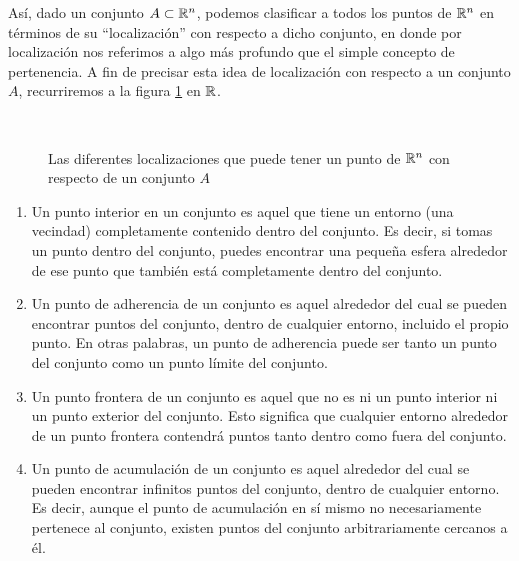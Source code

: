 Así, dado un conjunto $A \subset \RR[n]$, podemos clasificar a todos los puntos de $\RR[n]$ en términos de su “localización” con respecto a dicho conjunto, en donde por localización nos referimos a algo más profundo que el simple concepto de pertenencia. A fin de precisar esta idea de localización con respecto a un conjunto $A$, recurriremos a la figura \ref{fig:clasificacion_de_puntos} en $\RR$.
\begin{figure}[h!]
    \centering
     \hfill
     \\
     \hfill
    \caption{Las diferentes localizaciones que puede tener un punto de $\RR[n]$ con respecto de un conjunto $A$}
    \label{fig:clasificacion_de_puntos}
\end{figure}
\begin{enumerate}[label=\alph*)]
    \item Un punto interior en un conjunto es aquel que tiene un entorno (una vecindad) completamente contenido dentro del conjunto. Es decir, si tomas un punto dentro del conjunto, puedes encontrar una pequeña esfera alrededor de ese punto que también está completamente dentro del conjunto.
    \item Un punto de adherencia de un conjunto es aquel alrededor del cual se pueden encontrar puntos del conjunto, dentro de cualquier entorno, incluido el propio punto. En otras palabras, un punto de adherencia puede ser tanto un punto del conjunto como un punto límite del conjunto.
    \item Un punto frontera de un conjunto es aquel que no es ni un punto interior ni un punto exterior del conjunto. Esto significa que cualquier entorno alrededor de un punto frontera contendrá puntos tanto dentro como fuera del conjunto.
    \item Un punto de acumulación de un conjunto es aquel alrededor del cual se pueden encontrar infinitos puntos del conjunto, dentro de cualquier entorno. Es decir, aunque el punto de acumulación en sí mismo no necesariamente pertenece al conjunto, existen puntos del conjunto arbitrariamente cercanos a él.
\end{enumerate}

